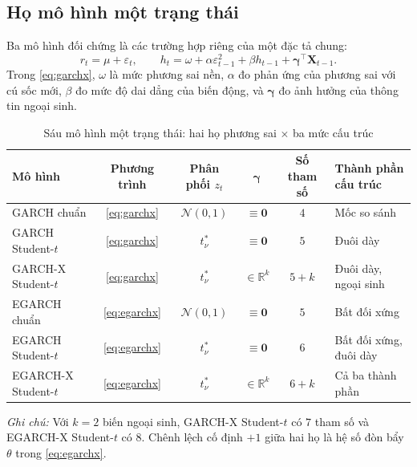 \documentclass[12pt,a4paper]{article}
\numberwithin{equation}{section}
\theoremstyle{definition}
\newcommand{\R}{\mathbb{R}}
\newcommand{\Xvec}{\symbf{X}}
\newcommand{\bmgamma}{\symbf{\gamma}}
\begin{document}
	\subsection{Họ mô hình một trạng thái}\label{subsec:single-regime}
	Ba mô hình đối chứng là các trường hợp riêng của một đặc tả chung:
	\begin{equation}
		r_t=\mu+\varepsilon_t,\qquad
		h_t=\omega+\alpha\varepsilon_{t-1}^{2}+\beta h_{t-1}+\bmgamma^{\top}\Xvec_{t-1}.
		\label{eq:garchx}
	\end{equation}
	Trong \eqref{eq:garchx}, $\omega$ là mức phương sai nền, $\alpha$ đo phản ứng của phương
	sai với cú sốc mới, $\beta$ đo mức độ dai dẳng của biến động, và $\bmgamma$ đo ảnh hưởng
	của thông tin ngoại sinh.
	
	\begin{table}[H]
		\centering\footnotesize
		\setlength{\tabcolsep}{4pt}
		\caption{Sáu mô hình một trạng thái: hai họ phương sai $\times$ ba mức cấu trúc}
		\label{tab:single-models}
		\begin{tabularx}{\textwidth}{l c c c c Y}
			\toprule
			\textbf{Mô hình} & \textbf{Phương trình} & \textbf{Phân phối $z_t$} & \textbf{$\bmgamma$} & \textbf{Số tham số} & \textbf{Thành phần cấu trúc} \\
			\midrule
			GARCH chuẩn & \eqref{eq:garchx} & $\mathcal{N}(0,1)$ & $\equiv\symbf 0$ & $4$ & Mốc so sánh \\
			GARCH Student-$t$ & \eqref{eq:garchx} & $t^{*}_{\nu}$ & $\equiv\symbf 0$ & $5$ & Đuôi dày \\
			GARCH-X Student-$t$ & \eqref{eq:garchx} & $t^{*}_{\nu}$ & $\in\R^{k}$ & $5+k$ & Đuôi dày, ngoại sinh \\
			\addlinespace[0.3em]
			EGARCH chuẩn & \eqref{eq:egarchx} & $\mathcal{N}(0,1)$ & $\equiv\symbf 0$ & $5$ & Bất đối xứng \\
			EGARCH Student-$t$ & \eqref{eq:egarchx} & $t^{*}_{\nu}$ & $\equiv\symbf 0$ & $6$ & Bất đối xứng, đuôi dày \\
			EGARCH-X Student-$t$ & \eqref{eq:egarchx} & $t^{*}_{\nu}$ & $\in\R^{k}$ & $6+k$ & Cả ba thành phần \\
			\bottomrule
		\end{tabularx}
		\vspace{0.3em}
		\raggedright\scriptsize
		\emph{Ghi chú:} Với $k=2$ biến ngoại sinh, GARCH-X Student-$t$ có $7$ tham số và
		EGARCH-X Student-$t$ có $8$. Chênh lệch cố định $+1$ giữa hai họ là hệ số đòn bẩy
		$\theta$ trong \eqref{eq:egarchx}.
	\end{table}
\end{document}
